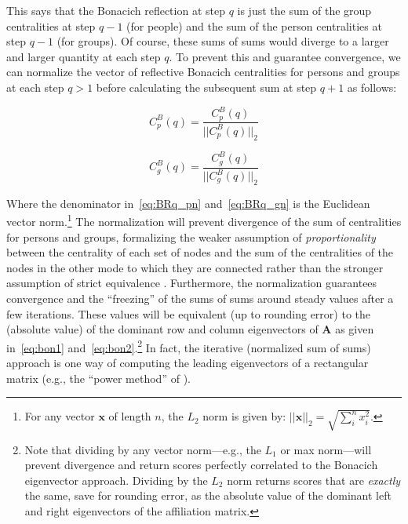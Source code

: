 \documentclass[a4paper,fleqn]{cas-sc}
\begin{document}
This says that the Bonacich reflection at step $q$ is just the sum of the group centralities at step $q-1$ (for people) and the sum of the person centralities at step $q-1$ (for groups). Of course, these sums of sums would diverge to a larger and larger quantity at each step $q$. To prevent this and guarantee convergence, we can normalize the vector of reflective Bonacich centralities for persons and groups at each step $q > 1$ before calculating the subsequent sum at step $q+1$ as follows:

\begin{equation}
   C^B_p(q) = \frac{C^B_p(q)}{||C^B_p(q)||_2}
   \label{eq:BRq_pn}
\end{equation} 

\begin{equation}
   C^B_g(q) = \frac{C^B_g(q)}{||C^B_g(q)||_2}
   \label{eq:BRq_gn}
\end{equation} 

Where the denominator in~\ref{eq:BRq_pn} and~\ref{eq:BRq_gn} is the Euclidean vector norm.\footnote{For any vector $\mathbf{x}$ of length $n$, the $L_2$ norm is given by: $||\mathbf{x}||_2 = \sqrt{\sum_i^n x_i^2}$.} The normalization will prevent divergence of the sum of centralities for persons and groups, formalizing the weaker assumption of \textit{proportionality} between the centrality of each set of nodes and the sum of the centralities of the nodes in the other mode to which they are connected rather than the stronger assumption of strict equivalence \citep{bonacich_lloyd01}. Furthermore, the normalization guarantees convergence and the ``freezing'' of the sums of sums around steady values after a few iterations. These values will be equivalent (up to rounding error) to the (absolute value) of the dominant row and column eigenvectors of $\mathbf{A}$ as given in~\ref{eq:bon1} and~\ref{eq:bon2}.\footnote{Note that dividing by any vector norm---e.g., the $L_1$ or max norm---will prevent divergence and return scores perfectly correlated to the Bonacich eigenvector approach. Dividing by the $L_2$ norm returns scores that are \textit{exactly} the same, save for rounding error, as the absolute value of the dominant left and right eigenvectors of the affiliation matrix.} In fact, the iterative (normalized sum of sums) approach is one way of computing the leading eigenvectors of a rectangular matrix (e.g., the ``power method'' of \citet{mises1929praktische}). 
\end{document}
